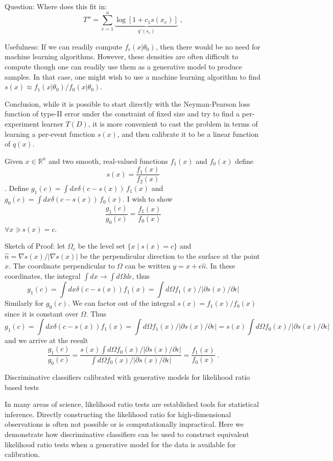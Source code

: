 \documentclass[11pt, oneside]{article}   	%
\begin{document}
Question:
Where does this fit in:
\[
T'' = \sum_{e=1}^n \underbrace{ \log \left[ 1+c_1 s(x_e) \right] }_{q'(s_e)} \;,
\]



Usefulness:
If we can readily compute $f_c(x|\theta_0)$, then there would be no need for machine learning algorithms. However,  these densities are often difficult to compute though one can readily use them as a generative model to produce samples. In that case, one might wish to use a machine learning algorithm to find $s(x) \approx f_1(x|\theta_0) / f_0(x|\theta_0)$. 

Conclusion, while it is possible to start directly with the Neyman-Pearson loss function of type-II error under the constraint of fixed size and try to find a per-experiment learner $T(D)$, it is more convenient to cast the problem in terms of learning a per-event function $s(x)$, and then calibrate it to be a linear function of $q(x)$.

\newpage

Given $x\in \mathbb{R}^n$ and two smooth, real-valued functions $f_1(x)$ and $f_0(x)$ define 
\[ 
s(x)=\frac{f_1(x)}{f_2(x)}
\].
Define $g_1(c) = \int dx \delta(c - s(x) ) \, f_1(x)$ and $g_0(c) = \int dx \delta(c - s(x) ) \, f_0(x)$.
I wish to show
\[
\frac{g_1(c)}{g_0(c)} = \frac{f_1(x)}{f_0(x)}
\]
$\forall x \ni s(x)=c$.

Sketch of Proof: 
let $\Omega_{c}$ be the level set $\{x \mid s(x) = c \}$ and $\hat{n}=\nabla s(x) / |\nabla s(x)|$ be the perpendicular direction to the surface at the point $x$. The  coordinate perpendicular to $\Omega$ can be written $y = x+\epsilon \hat{n}$. In these coordinates, the integral $\int dx \to \int d\Omega d\epsilon$, thus
\[
g_1(c) = \int dx \delta(c-s(x)) f_1(x) = \int d\Omega f_1(x) / |\partial s(x)/\partial \epsilon|
\]
Similarly for $g_0(c)$. We can factor out of the integral $s(x)=f_1(x)/f_0(x)$ since it is constant over $\Omega$.
Thus
\[
g_1(c) = \int dx \delta(c-s(x)) f_1(x) = \int d\Omega f_1(x) / |\partial s(x)/\partial \epsilon| = s(x) \int d\Omega f_0(x) / |\partial s(x)/\partial \epsilon|
\]
and we arrive at the result
\[
\frac{g_1(c)}{g_0(c)} = \frac{s(x) \int d\Omega f_0(x) / |\partial s(x)/\partial \epsilon|}{ \int d\Omega f_0(x) / |\partial s(x)/\partial \epsilon|} = \frac{f_1(x)}{f_0(x)} \;.
\]


\newpage

Discriminative classifiers calibrated with generative models for likelihood ratio based tests

In many areas of science, likelihood ratio tests  are established tools for statistical inference. 
Directly constructing the likelihood ratio for high-dimensional observations 
is often not possible or is computationally impractical. Here we demonstrate how 
discriminative classifiers can be used to construct equivalent likelihood ratio tests when 
a generative model for the data is available for calibration. 
\end{document}
